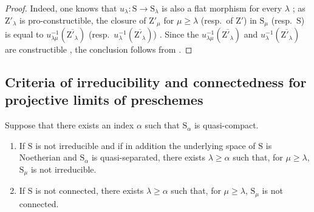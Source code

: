 \begin{proof}
Indeed, one knows that $u_\lambda:\mathrm{S}\to\mathrm{S}_\lambda$ is also a flat morphism for every $\lambda$ ; as $\mathrm{Z}'_\lambda$ is pro-constructible, the closure of $\mathrm{Z}'_\mu$ for $\mu\geqslant\lambda$ (resp.\ of $\mathrm{Z}'$) in $\mathrm{S}_\mu$ (resp.\ $\mathrm{S}$) is equal to $u_{\lambda\mu}^{-1}(\overline{\mathrm{Z}'_\lambda})$ (resp.\ $u_\lambda^{-1}(\overline{\mathrm{Z}'_\lambda})$) .
Since the $u_{\lambda\mu}^{-1}(\overline{\mathrm{Z}'_\lambda})$ and $u_\lambda^{-1}(\overline{\mathrm{Z}'_\lambda})$ are constructible , the conclusion follows from .
\end{proof}

\subsection{Criteria of irreducibility and connectedness for projective limits of preschemes}
\label{subsection:IV.8.4}

\begin{proposition}[8.4.1]
\label{IV.8.4.1}
Suppose that there exists an index $\alpha$ such that $\mathrm{S}_\alpha$ is quasi-compact.
\begin{enumerate}[label=(\roman*)]
  \item If $\mathrm{S}$ is not irreducible and if in addition the underlying space of $\mathrm{S}$ is Noetherian and $\mathrm{S}_\alpha$ is quasi-separated, there exists $\lambda\geqslant\alpha$ such that, for $\mu\geqslant\lambda$, $\mathrm{S}_\mu$ is not irreducible.
  \item If $\mathrm{S}$ is not connected, there exists $\lambda\geqslant\alpha$ such that, for $\mu\geqslant\lambda$, $\mathrm{S}_\mu$ is not connected.
\end{enumerate}
\end{proposition}

